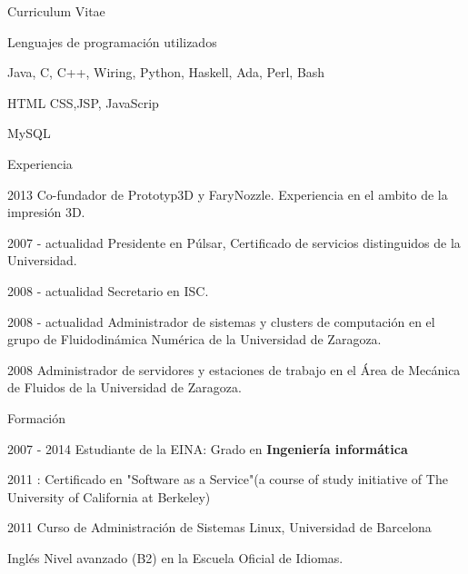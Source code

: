 \begin{cv}{Curriculum Vitae}

\begin{cvlist}{Lenguajes de programación utilizados}
\item Java, C, C++, Wiring, Python, Haskell, Ada, Perl, Bash
\item HTML CSS,JSP, JavaScrip
\item MySQL
\end{cvlist}

\begin{cvlist}{Experiencia}

	\item[2013] Co-fundador de Prototyp3D y FaryNozzle. Experiencia en el ambito de la impresión 3D.
	\item[2007 - actualidad] Presidente en Púlsar, Certificado de servicios distinguidos de la Universidad.
	\item[2008 - actualidad] Secretario en ISC.
	\item[2008 - actualidad] Administrador de sistemas y clusters de computación en el grupo de Fluidodinámica Numérica de la Universidad de Zaragoza.
	\item[2008] Administrador de servidores y estaciones de trabajo en el Área de Mecánica de Fluidos de la Universidad de Zaragoza.

\end{cvlist}

\begin{cvlist}{Formación}

	\item[2007 - 2014] Estudiante de la EINA: Grado en \textbf{Ingeniería informática}
	\item[2011]: Certificado en "Software as a Service"(a course of study initiative of The University of California at Berkeley) 
	\item [2011] Curso de Administración de Sistemas Linux, Universidad de Barcelona
	\item [Inglés] Nivel avanzado (B2) en la Escuela Oficial de Idiomas.

\end{cvlist}

\end{cv}
